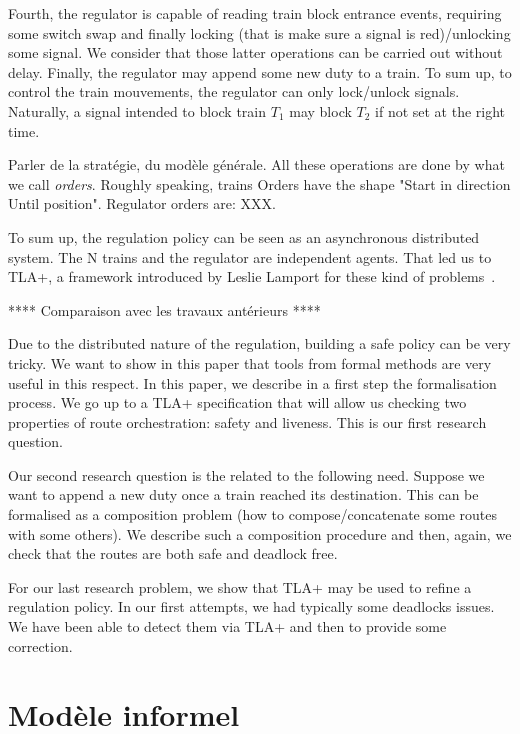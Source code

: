 \documentclass[runningheads]{llncs}
\begin{document}
Fourth,  the regulator is capable of reading train block entrance events, requiring some switch swap and finally locking (that is make sure a signal is red)/unlocking some signal. We consider that those latter operations can be carried out without delay. Finally, the regulator may append some new duty to a train. To sum up, to control the train mouvements, the regulator can only lock/unlock signals. Naturally, a signal intended to block train $T_1$ may block $T_2$ if not set at the right time.   
 
 Parler de la stratégie, du modèle générale. All these operations are done by what we call  \emph{orders}. Roughly speaking, trains Orders have the shape "Start in direction Until position". Regulator orders are: XXX. 
 
 
 To sum up, the regulation policy can be seen as an asynchronous distributed system. The N trains and the regulator are independent agents. That led us to TLA+, a framework introduced by Leslie Lamport for these kind of problems~\cite{Lamport}.  
 
 
 **** Comparaison avec les travaux antérieurs ****
 
 
Due to the distributed nature of the regulation, building a safe policy can be very tricky. We want to show in this paper that tools from formal methods are very useful in this respect.  In this paper, we describe in  a first step the formalisation process. We go up to a TLA+ specification that will allow us checking two properties of route orchestration: safety and liveness. This is our first research question. 

Our second research question is the related to the following need. Suppose we want to append a new duty once a train reached its destination. This can be formalised as a composition problem (how to compose/concatenate some routes with some others). We describe such a composition procedure and then, again, we check that the routes are both safe and deadlock free. 

For our last research problem, we show that TLA+ may be used to refine a regulation policy. In our first attempts, we had typically some deadlocks issues. We have been able to detect them via TLA+ and then to provide some correction. 




\section{Modèle informel}
\label{sec:informal-model}
\end{document}
